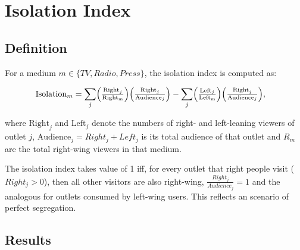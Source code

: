 \documentclass[12pt]{article}
\begin{document}
\newpage



\section{Isolation Index }
\label{sec:isolation}

\subsection{Definition}

For a medium $m\in \{TV,Radio,Press\}$, the isolation index is computed as:


\begin{equation}\label{eq:isolation}
\begin{aligned}
	& \mathrm{Isolation}_m=%
	\sum_{j}
	\Bigl(\tfrac{\mathrm{Right}_j}{\mathrm{Right_m}}\Bigr)
	\Bigl(\tfrac{\mathrm{Right}_j}{\mathrm{Audience}_j}\Bigr)
	-
	\sum_{j}
	\Bigl(\tfrac{\mathrm{Left}_j}{\mathrm{Left_m}}\Bigr)
	\Bigl(\tfrac{\mathrm{Right}_j}{\mathrm{Audience}_j}\Bigr),
\end{aligned}
\end{equation} 


%
where $\mathrm{Right}_j$ and $\mathrm{Left}_j$ denote the numbers of right- and left-leaning viewers of outlet $j$, $\text{Audience}_j=Right_j + Left_j$ is its total audience of that outlet and $R_m$ are the total right-wing viewers in that medium. 

The isolation index takes value of 1 iff, for every outlet that right people visit ($Right_j>0$), then all other visitors are also right-wing, $\frac{Right_j}{Audience_j}=1$ and the analogous for outlets consumed by left-wing users. This reflects an scenario of perfect segregation. 




\subsection{Results}
\FloatBarrier	
\end{document}
